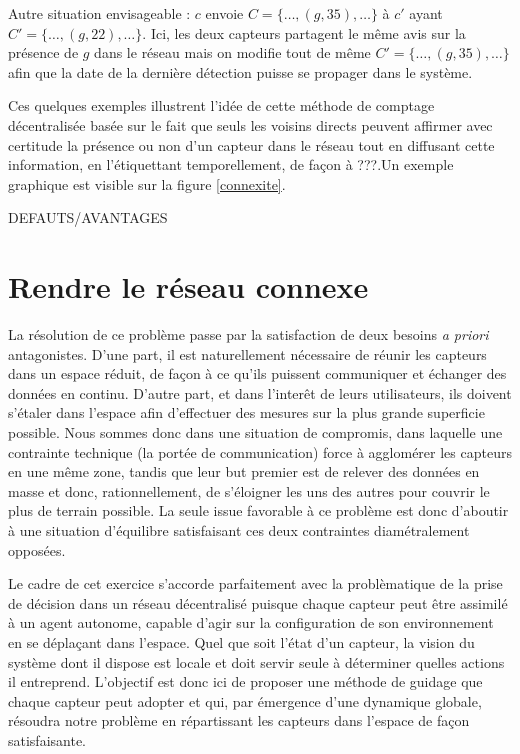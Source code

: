 \documentclass[10pt]{article}
\begin{document}
\begin{multicols}{2}
Autre situation envisageable : $c$ envoie $C = \{\dots,(g,35),\dots\}$
à $c'$ ayant $C' = \{\dots,(g,22),\dots\}$. Ici, les deux capteurs
partagent le même avis sur la présence de $g$ dans le réseau mais on
modifie tout de même $C' = \{\dots,(g,35),\dots\}$ afin que la date de
la dernière détection puisse se propager dans le système.

Ces quelques exemples illustrent l'idée de cette méthode de comptage
décentralisée basée sur le fait que seuls les voisins directs peuvent
affirmer avec certitude la présence ou non d'un capteur dans le réseau
tout en diffusant cette information, en l'étiquettant temporellement,
de façon à ???.Un exemple graphique est visible sur la figure
\ref{connexite}.

DEFAUTS/AVANTAGES

\section{Rendre le réseau connexe}

La résolution de ce problème passe par la satisfaction de deux besoins
\textit{a priori} antagonistes. D'une part, il est naturellement
nécessaire de réunir les capteurs dans un espace réduit, de façon à ce
qu'ils puissent communiquer et échanger des données en
continu. D'autre part, et dans l'interêt de leurs utilisateurs, ils
doivent s'étaler dans l'espace afin d'effectuer des mesures sur la
plus grande superficie possible. Nous sommes donc dans une situation
de compromis, dans laquelle une contrainte technique (la portée de
communication) force à agglomérer les capteurs en une même zone,
tandis que leur but premier est de relever des données en masse et
donc, rationnellement, de s'éloigner les uns des autres pour couvrir
le plus de terrain possible. La seule issue favorable à ce problème
est donc d'aboutir à une situation d'équilibre satisfaisant ces deux
contraintes diamétralement opposées.

Le cadre de cet exercice s'accorde parfaitement avec la problèmatique
de la prise de décision dans un réseau décentralisé puisque chaque
capteur peut être assimilé à un agent autonome, capable d'agir sur la
configuration de son environnement en se déplaçant dans l'espace. Quel
que soit l'état d'un capteur, la vision du système dont il dispose est
locale et doit servir seule à déterminer quelles actions il
entreprend. L'objectif est donc ici de proposer une méthode de guidage
que chaque capteur peut adopter et qui, par émergence d'une dynamique
globale, résoudra notre problème en répartissant les capteurs dans
l'espace de façon satisfaisante.


\end{multicols}
\end{document}
